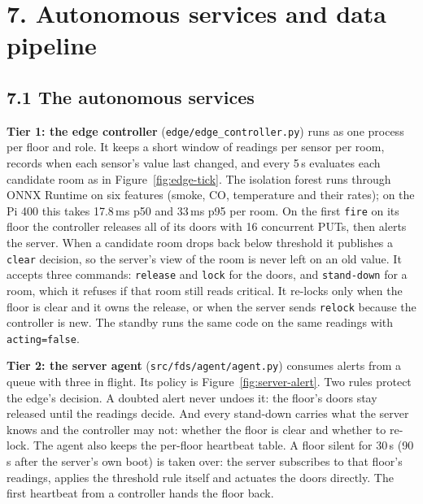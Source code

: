 \documentclass[11pt]{article}
\begin{document}
\section{7. Autonomous services and data pipeline}

\subsection{7.1 The autonomous services}

\textbf{Tier 1: the edge controller} (\texttt{edge/edge\_controller.py}) runs as one process per 
floor and role. It keeps a short window of readings per sensor per room, records when each 
sensor's value last changed, and every 5\,s evaluates each candidate room as in Figure~\ref{fig:edge-tick}. 
The isolation forest runs through ONNX Runtime on six features (smoke, CO, temperature and their rates); 
on the Pi 400 this takes 17.8\,ms p50 and 33\,ms p95 per room. On the first \texttt{fire} on its floor the controller 
releases all of its doors with 16 concurrent PUTs, then alerts the server. When a candidate room drops back below threshold it 
publishes a \texttt{clear} decision, so the server's view of the room is never left on an old 
value. It accepts three commands: \texttt{release} and \texttt{lock} for the doors, and 
\texttt{stand-down} for a room, which it refuses if that room still reads critical. It re-locks 
only when the floor is clear and it owns the release, or when the server sends \texttt{relock} 
because the controller is new. The standby runs the same code on the same readings 
with \texttt{acting=false}.

\textbf{Tier 2: the server agent} (\texttt{src/fds/agent/agent.py}) consumes alerts from a queue 
with three in flight. Its policy is Figure~\ref{fig:server-alert}. Two rules 
protect the edge's decision. A doubted alert never undoes it: the floor's doors stay released 
until the readings decide. And every stand-down carries what the server knows and the controller 
may not: whether the floor is clear and whether to re-lock. The agent also keeps the per-floor 
heartbeat table. A floor silent for 30\,s (90\,s after the server's own boot) is taken over: the 
server subscribes to that floor's readings, applies the threshold rule itself and actuates the 
doors directly. The first heartbeat from a controller hands the floor back.
\end{document}
